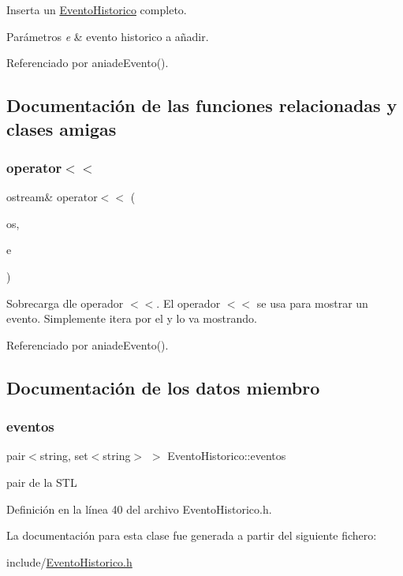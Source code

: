 Inserta un \hyperlink{classEventoHistorico}{Evento\+Historico} completo. 


\begin{DoxyParams}{Parámetros}
{\em e} & evento historico a añadir. \\
\hline
\end{DoxyParams}


Referenciado por aniade\+Evento().



\subsection{Documentación de las funciones relacionadas y clases amigas}
\hypertarget{classEventoHistorico_aa832ccb9c8af9ae4b90ce61d84cb21b0}{}\label{classEventoHistorico_aa832ccb9c8af9ae4b90ce61d84cb21b0} 
\subsubsection{\texorpdfstring{operator$<$$<$}{operator<<}}
{\footnotesize\ttfamily ostream\& operator$<$$<$ (\begin{DoxyParamCaption}\item[{ostream \&}]{os,  }\item[{\hyperlink{classEventoHistorico}{Evento\+Historico} \&}]{e }\end{DoxyParamCaption})\hspace{0.3cm}{\ttfamily [friend]}}



Sobrecarga dle operador $<$$<$. El operador $<$$<$ se usa para mostrar un evento. Simplemente itera por el y lo va mostrando. 



Referenciado por aniade\+Evento().



\subsection{Documentación de los datos miembro}
\hypertarget{classEventoHistorico_a6abe942b12ab22f551062d7ee9e9e02d}{}\label{classEventoHistorico_a6abe942b12ab22f551062d7ee9e9e02d} 
\subsubsection{\texorpdfstring{eventos}{eventos}}
{\footnotesize\ttfamily pair$<$string, set$<$string$>$ $>$ Evento\+Historico\+::eventos\hspace{0.3cm}{\ttfamily [private]}}

pair de la S\+TL 

Definición en la línea 40 del archivo Evento\+Historico.\+h.



La documentación para esta clase fue generada a partir del siguiente fichero\+:\begin{DoxyCompactItemize}
\item 
include/\hyperlink{EventoHistorico_8h}{Evento\+Historico.\+h}\end{DoxyCompactItemize}
